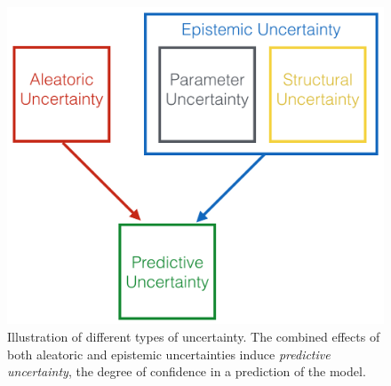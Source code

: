 \begin{figure}[bt]
	\includegraphics[width=0.5\linewidth]{chapter_1/uncertainty_taxonomy.png}
	\centering	
	\caption{\small Illustration of different types of uncertainty. The combined effects of both aleatoric and epistemic uncertainties induce \textit{predictive uncertainty}, the degree of confidence in a prediction of the model.  } 
	\label{fig:uncertainty_taxonomy}
\end{figure}
 
% 

 




